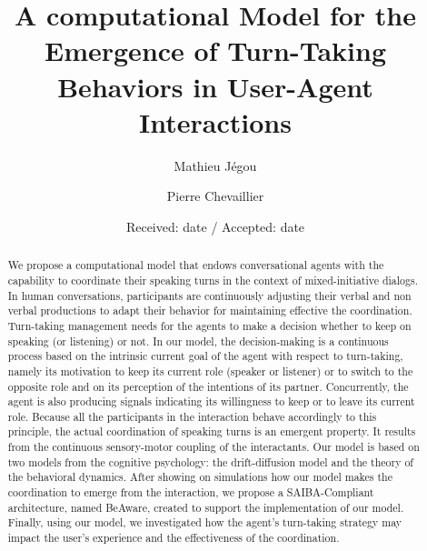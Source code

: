 \documentclass[twocolumn]{svjour3}
\begin{document}
\title{A computational Model for the Emergence of Turn-Taking Behaviors in User-Agent Interactions}

\author{Mathieu J\'egou  \and
        Pierre Chevaillier
}


\date{Received: date / Accepted: date}

\maketitle 

\begin{abstract}
We propose a computational model that endows conversational agents with the capability to coordinate their speaking turns in the context of mixed-initiative dialogs.
In human conversations, participants are continuously adjusting their verbal and non verbal productions to adapt their behavior for maintaining effective the coordination. Turn-taking management needs for the agents to make a decision whether to keep on speaking (or listening) or not. In our model, the decision-making is a continuous process based on the intrinsic current goal of the agent with respect to turn-taking, namely its motivation to keep its current role (speaker or listener) or to switch to the opposite role and on its perception of the intentions of its partner. Concurrently, the agent is also producing signals indicating its willingness to keep or to leave its current role. Because all the participants in the interaction behave accordingly to this principle, the actual coordination of speaking turns is an emergent property. It results from the continuous sensory-motor coupling of the interactants. Our model is based on two models from the cognitive psychology: the drift-diffusion model and the theory of the behavioral dynamics. After showing on simulations how our model makes the coordination to emerge from the interaction, we propose a SAIBA-Compliant architecture, named BeAware, created to support the implementation of our model. Finally, using our model, we investigated how the agent's turn-taking strategy may impact the user's experience and the effectiveness of the coordination.

 
\end{abstract}


















\end{document}
